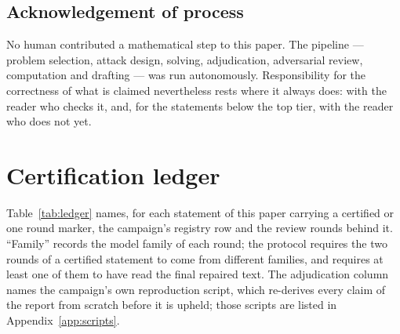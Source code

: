 \subsection*{Acknowledgement of process}

No human contributed a mathematical step to this paper. The pipeline --- problem selection,
attack design, solving, adjudication, adversarial review, computation and drafting --- was
run autonomously. Responsibility for the correctness of what is claimed nevertheless rests
where it always does: with the reader who checks it, and, for the statements below the top
tier, with the reader who does not yet.

\appendix

\section{Certification ledger}\label{app:ledger}

Table~\ref{tab:ledger} names, for each statement of this paper carrying a
\textsf{certified} or \textsf{one round} marker, the campaign's registry row and the review
rounds behind it. ``Family'' records the model family of each round; the protocol
requires the two rounds of a certified statement to come from different families, and
requires at least one of them to have read the final repaired text. The adjudication column
names the campaign's own reproduction script, which re-derives every claim of the report
from scratch before it is upheld; those scripts are listed in
Appendix~\ref{app:scripts}.

